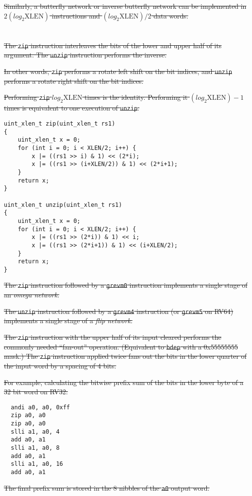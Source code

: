 \sout{
Similarly, a butterfly network or inverse butterfly network can be implemented
in $2(log_2\textrm{XLEN})$ instructions and $(log_2\textrm{XLEN})/2$ data words.
}


\section{}

\sout{
The \texttt{zip} instruction interleaves the bits of the lower and upper
half of its argument. The \texttt{unzip} instruction performs the inverse.
}

\sout{
In other words, \texttt{zip} performs a rotate left shift on the bit indices,
and \texttt{unzip} performs a rotate right shift on the bit indices.
}

\sout{
Performing \texttt{zip} $log_2\textrm{XLEN}$ times is the identity. Performing it
$(log_2\textrm{XLEN})-1$ times is equivalent to one execution of \texttt{unzip}.
}

\begin{verbatim}
uint_xlen_t zip(uint_xlen_t rs1)
{
    uint_xlen_t x = 0;
    for (int i = 0; i < XLEN/2; i++) {
        x |= ((rs1 >> i) & 1) << (2*i);
        x |= ((rs1 >> (i+XLEN/2)) & 1) << (2*i+1);
    }
    return x;
}

uint_xlen_t unzip(uint_xlen_t rs1)
{
    uint_xlen_t x = 0;
    for (int i = 0; i < XLEN/2; i++) {
        x |= ((rs1 >> (2*i)) & 1) << i;
        x |= ((rs1 >> (2*i+1)) & 1) << (i+XLEN/2);
    }
    return x;
}
\end{verbatim}

\sout{
The \texttt{zip} instruction followed by a \texttt{grevm0} instruction
implements a single stage of an {\it omega network}.
}

\sout{
The \texttt{unzip} instruction followed by a \texttt{grevm4} instruction (or
\texttt{grevm5} on RV64) implements a single stage of a {\it flip network}.
}

\sout{
The \texttt{zip} instruction with the upper half of its input cleared performs
the commonly needed ``fan-out'' operation. (Equivalent to {\tt bdep} with a
0x55555555 mask.) The \texttt{zip} instruction applied twice fans out the bits
in the lower quarter of the input word by a spacing of 4 bits.
}

\sout{
For example, calculating the bitwise prefix sum of the bits in the lower byte
of a 32 bit word on RV32:
}

\begin{verbatim}
  andi a0, a0, 0xff
  zip a0, a0
  zip a0, a0
  slli a1, a0, 4
  add a0, a1
  slli a1, a0, 8
  add a0, a1
  slli a1, a0, 16
  add a0, a1
\end{verbatim}

\sout{
The final prefix sum is stored in the 8 nibbles of the {\tt a0} output word.
}
